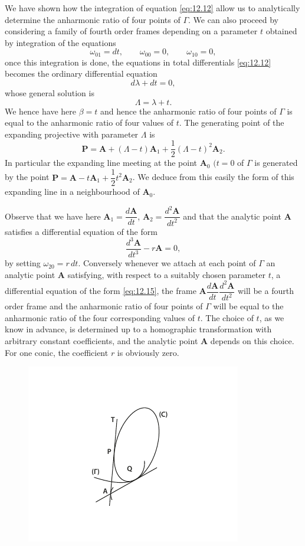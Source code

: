 \documentclass[leqno,11pt]{book}
\numberwithin{equation}{chapter}
\theoremstyle{shape1}
\theoremstyle{shapesmall}
\begin{document}
We have shown how the integration of equation \eqref{eq:12.12} allow us to analytically determine the anharmonic ratio of four points of $\Gamma$. We can also proceed by considering a family of fourth order frames depending on a parameter $t$ obtained by integration of the equations
\[
\omega_{01}=dt,\qquad\omega_{00}=0,\qquad\omega_{10}=0,
\]
once this integration is done, the equations in total differentials \eqref{eq:12.12} becomes the ordinary differential equation
\[
d\lambda+dt=0,
\]
whose general solution is
\[
\Lambda=\lambda+t.
\]
We hence have here $\beta=t$ and hence the anharmonic ratio of four points of $\Gamma$ is equal to the anharmonic ratio of four values of $t$. The generating point of the expanding projective with parameter $\Lambda$ is
\[
\mathbf{P}=\mathbf{A}+(\Lambda-t)\mathbf{A}_{1}+\frac{1}{2}(\Lambda-t)^{2}\mathbf{A}_{2}.
\]
In particular the expanding line meeting at the point $\mathbf{A}_{0}$ $(t=0$ of $\Gamma$ is generated by the point $\mathbf{P}=\mathbf{A}-t\mathbf{A}_{1}+\dfrac{1}{2}t^{2}\mathbf{A}_{2}$. We deduce from this easily the form of this expanding line in a neighbourhood of $\mathbf{A}_{0}$.

Observe that we have here $\mathbf{A}_{1}=\dfrac{d\mathbf{A}}{dt}$, $\mathbf{A}_{2}=\dfrac{d^{2}\mathbf{A}}{dt^{2}}$ and that the analytic point $\mathbf{A}$ satisfies a differential equation of the form
\begin{equation}
  \label{eq:12.15}
  \frac{d^{3}\mathbf{A}}{dt^{3}}-r\mathbf{A}=0,
\end{equation}
by setting $\omega_{20}=r\,dt$. Conversely whenever we attach at each point of $\Gamma$ an analytic point $\mathbf{A}$ satisfying, with respect to a suitably chosen parameter $t$, a differential equation of the form \eqref{eq:12.15}, the frame $\mathbf{A}\dfrac{d\mathbf{A}}{dt}\dfrac{d^{2}\mathbf{A}}{dt^{2}}$ will be a fourth order frame and the anharmonic ratio of four points of $\Gamma$ will be equal to the anharmonic ratio of the four corresponding values of $t$. The choice of $t$, as we know in advance, is determined up to a homographic transformation with arbitrary constant coefficients, and the analytic point $\mathbf{A}$ depends on this choice. For one conic, the coefficient $r$ is obviously zero.

\begin{figure}[h]
  \caption{}
  \centering
\includegraphics[scale=1.8]{cartangrp-f7}  
\label{fig:12.2}
\end{figure}
\end{document}

